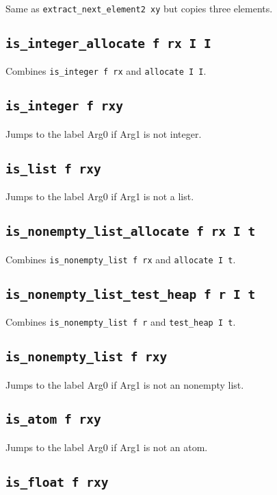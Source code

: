 \documentclass{article}
\newcommand{\iop}[1]{\texttt{#1}}
\begin{document}
Same as \iop{extract\_next\_element2 xy} but copies three elements.

\subsection*{\iop{is\_integer\_allocate f rx I I}}

Combines \iop{is\_integer f rx} and \iop{allocate I I}.

\subsection*{\iop{is\_integer f rxy}}

Jumps to the label Arg0 if Arg1 is not integer.

\subsection*{\iop{is\_list f rxy}}

Jumps to the label Arg0 if Arg1 is not a list.

\subsection*{\iop{is\_nonempty\_list\_allocate f rx I t}}

Combines \iop{is\_nonempty\_list f rx} and \iop{allocate I t}.

\subsection*{\iop{is\_nonempty\_list\_test\_heap f r I t}}

Combines \iop{is\_nonempty\_list f r} and \iop{test\_heap I t}.

\subsection*{\iop{is\_nonempty\_list f rxy}}

Jumps to the label Arg0 if Arg1 is not an nonempty list.

\subsection*{\iop{is\_atom f rxy}}

Jumps to the label Arg0 if Arg1 is not an atom.

\subsection*{\iop{is\_float f rxy}}
\end{document}
